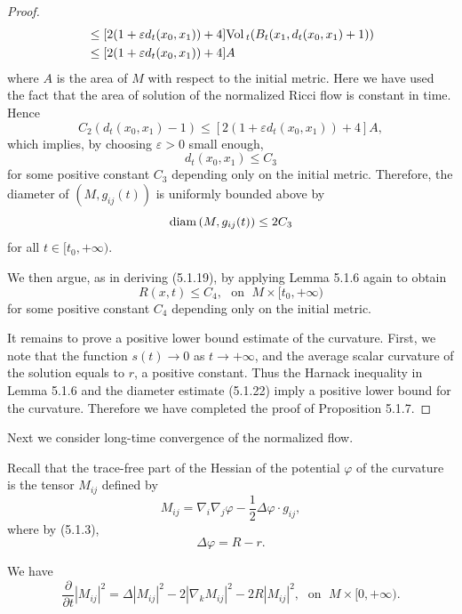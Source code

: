 \begin{proof}
\begin{displaymath}
\begin{split}
&  \leq [2(1+\varepsilon d_t(x_0,x_1))+4]
{\rm Vol}\,_t(B_t(x_1,d_t(x_0,x_1)+1))\\
&  \leq [2(1+\varepsilon d_t(x_0,x_1))+4]A
\end{split}
\end{displaymath}
where $A$ is the area of $M$ with respect to the initial metric.
Here we have used the fact that the area of solution of the
normalized Ricci flow is constant in time. Hence
$$
C_2(d_t(x_0,x_1)-1)\leq[2(1+\varepsilon d_t(x_0,x_1))+4] A,
$$
which implies, by choosing $\varepsilon>0$ small enough,
$$
d_t(x_0,x_1)\leq C_3
$$
for some positive constant $C_3$ depending only on the initial
metric. Therefore, the diameter of $(M,g_{ij}(t))$ is uniformly
bounded above by \begin{equation}
{\rm diam}\,(M,g_{ij}(t))\leq 2C_3  %
\end{equation} for all $t\in[t_0,+\infty)$.

We then argue, as in deriving (5.1.19), by applying Lemma 5.1.6
again to obtain
$$
R(x,t)\leq C_4,\ \ \ \text{on }\; M\times[t_0,+\infty)
$$
for some positive constant $C_4$ depending only on the initial
metric.

It remains to prove a positive lower bound estimate of the
curvature. First, we note that the function $s(t)\to 0$ as
$t\rightarrow+\infty$, and the average scalar curvature of the
solution equals to $r$, a positive constant. Thus the Harnack
inequality in Lemma 5.1.6 and the diameter estimate (5.1.22) imply
a positive lower bound for the curvature. Therefore we have
completed the proof of Proposition 5.1.7.
\end{proof}

Next we consider long-time convergence of the normalized flow.

Recall that the trace-free part of the Hessian of the potential
$\varphi$ of the curvature is the tensor $M_{ij}$ defined by
$$
M_{ij}=\nabla_i\nabla_j\varphi-\frac{1}{2}\Delta\varphi\cdot
g_{ij},
$$
where by (5.1.3),
$$
\Delta\varphi=R-r.
$$

\begin{lemma} 
  \label{lem:cz-tracefree-hessian-evolution}

We have \begin{equation} \frac{\partial}{\partial t}|M_{ij}|^2
=\Delta|M_{ij}|^2-2|\nabla_k M_{ij}|^2-2R|M_{ij}|^2,
\; \text{ on }\; M\times[0,+\infty). %
\end{equation}
\end{lemma}

